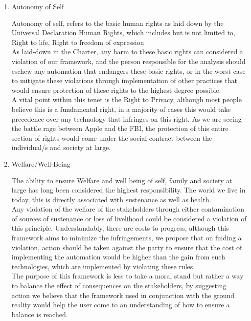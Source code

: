 \begin{enumerate}
\item Autonomy of Self
\begin{pointenv}
Autonomy of self, refers to the basic human rights as laid down by the Universal Declaration Human Rights\cite{assembly1948universal}, which includes but is not limited to, Right to life, Right to freedom of expression\\
As laid-down in the Charter, any harm to these basic rights can considered a violation of our framework, and the person responsible for the analysis should eschew any automation that endangers these basic rights, or in the worst case to mitigate these violations through implementation of other practices that would ensure protection of these rights to the highest degree possible.\\
A vital point within this tenet is the Right to Privacy, although most people believe this is a fundamental right, in a majority of  cases this would take precedence over any technology that infringes on this right. As we are seeing the battle rage between Apple and the FBI, the protection of this entire section of rights would come under the social contract between the individual/s and society at large. 
\end{pointenv}

\item Welfare/Well-Being
\begin{pointenv}
The ability to ensure Welfare and well being of self, family and society at large has long been considered the highest responsibility. The world we live in today, this is directly associated with sustenance as well as health.\\
Any violation of the welfare of the stakeholders through either contamination of sources of sustenance or loss of livelihood could be considered a violation of this principle. Understandably, there are costs to progress, although this framework aims to minimize the infringements, we propose that on finding a violation, action should be taken against the party to ensure that the cost of implementing the automation would be higher than the gain from such technologies, which are implemented by violating these rules.\\
The purpose of this framework is less to take a moral stand but rather a way to balance the effect of consequences on the stakeholders, by suggesting action we believe that the framework used in conjunction with the ground reality would help the user come to an understanding of how to ensure a balance is reached. 
\end{pointenv}
\end{enumerate}

